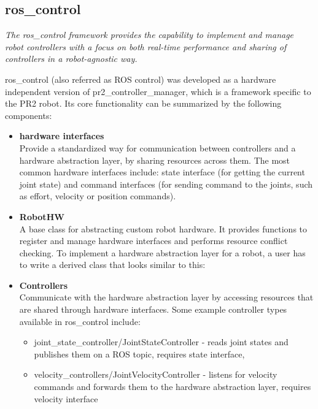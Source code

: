 \documentclass[english,inz,shortabstract]{iithesis}
\begin{document}
    \subsection{ros\_control}
    
    \textit{The ros\_control framework provides the capability to implement and manage robot controllers with a focus on both real-time performance and sharing of controllers in a robot-agnostic way.} 
    \cite{ros_control:paper}
    
    \textsf{ros\_control} (also referred as \textsf{ROS control}) was developed as a hardware independent version of \textsf{pr2\_controller\_manager}, which is a framework specific to the PR2 robot. Its core functionality can be summarized by the following components:

    \begin{itemize}
        \item \textbf{hardware interfaces}\\
        Provide a standardized way for communication between controllers and a hardware abstraction layer, by sharing resources across them. The most common hardware interfaces include: state interface (for getting the current joint state) and command interfaces (for sending command to the joints, such as effort, velocity or position commands).   
        \item \textbf{RobotHW}\\
        A base class for abstracting custom robot hardware. It provides functions to register and manage hardware interfaces and performs resource conflict checking. To implement a hardware abstraction layer for a robot, a user has to write a derived class that looks similar to this:
        
        \item \textbf{Controllers}\\
        Communicate with the hardware abstraction layer by accessing resources that are shared through hardware interfaces. Some example controller types available in \textsf{ros\_control} include:
            \begin{itemize}
                \item \textsf{joint\_state\_controller/JointStateController} - reads joint states and publishes them on a ROS topic, requires state interface,
                \item \textsf{velocity\_controllers/JointVelocityController} - listens for velocity commands and forwards them to the hardware abstraction layer, requires velocity interface

\end{itemize}
\end{itemize}
\end{document}
